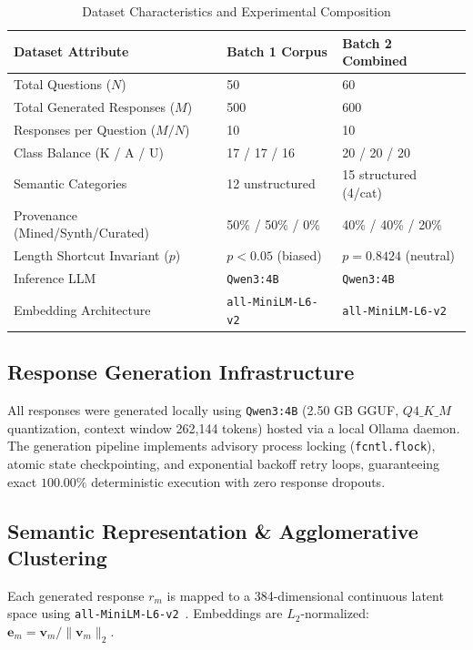 \documentclass[conference]{IEEEtran}
\begin{document}
\begin{table}[t]
\caption{Dataset Characteristics and Experimental Composition}
\label{tab:dataset}
\centering
\begin{tabularx}{\columnwidth}{lXX}
\toprule
\textbf{Dataset Attribute} & \textbf{Batch 1 Corpus} & \textbf{Batch 2 Combined} \\
\midrule
Total Questions ($N$) & 50 & 60 \\
Total Generated Responses ($M$) & 500 & 600 \\
Responses per Question ($M/N$) & 10 & 10 \\
Class Balance (\textsc{K} / \textsc{A} / \textsc{U}) & 17 / 17 / 16 & 20 / 20 / 20 \\
Semantic Categories & 12 unstructured & 15 structured (4/cat) \\
Provenance (Mined/Synth/Curated) & 50\% / 50\% / 0\% & 40\% / 40\% / 20\% \\
Length Shortcut Invariant ($p$) & $p < 0.05$ (biased) & $p = 0.8424$ (neutral) \\
Inference LLM & \texttt{Qwen3:4B} & \texttt{Qwen3:4B} \\
Embedding Architecture & \texttt{all-MiniLM-L6-v2} & \texttt{all-MiniLM-L6-v2} \\
\bottomrule
\end{tabularx}
\end{table}

\subsection{Response Generation Infrastructure}
All responses were generated locally using \texttt{Qwen3:4B} (2.50 GB GGUF, $Q4\_K\_M$ quantization, context window 262,144 tokens) hosted via a local Ollama daemon. The generation pipeline implements advisory process locking (\texttt{fcntl.flock}), atomic state checkpointing, and exponential backoff retry loops, guaranteeing exact $100.00\%$ deterministic execution with zero response dropouts.

\subsection{Semantic Representation \& Agglomerative Clustering}
Each generated response $r_m$ is mapped to a 384-dimensional continuous latent space using \texttt{all-MiniLM-L6-v2}~\cite{reimers2019sentence}. Embeddings are $L_2$-normalized: $\mathbf{e}_m = \mathbf{v}_m / \|\mathbf{v}_m\|_2$.
\end{document}
